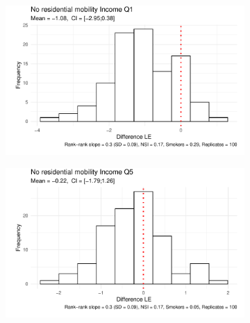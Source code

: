 \begin{figure}[htp]
    \caption{Micro-simulated life expectancy (LE) differences for the\newline rank-rank slope effect on smoking by income Q1 and Q5} \label{ch04:microsimulation_income}\vspace{5mm}
     \centering
     \begin{subfigure}[b]{0.50\textwidth}
         \centering
         \includegraphics[width=\textwidth]{plots/microsimulation/microsimulation_1_1.pdf}
     \end{subfigure}%
     \begin{subfigure}[b]{0.50\textwidth}
         \centering
         \includegraphics[width=\textwidth]{plots/microsimulation/microsimulation_1_5.pdf}
     \end{subfigure}\vspace{5mm}
     

\end{figure}
